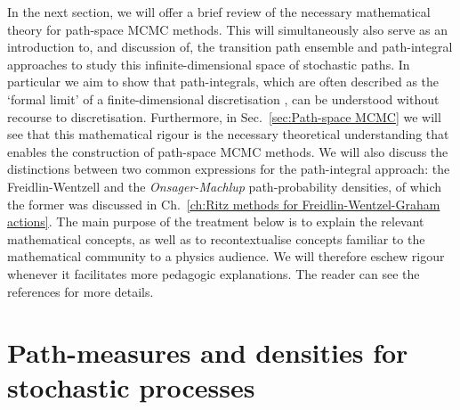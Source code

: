 In the next section, we will offer a brief review of the necessary mathematical theory for path-space MCMC methods. This will simultaneously also serve as an introduction to, and discussion of, the transition path ensemble and path-integral approaches to study this infinite-dimensional space of stochastic paths. In particular we aim to show that path-integrals, which are often described as the `formal limit' of a finite-dimensional discretisation \citep{mossNoiseNonlinearDynamical1989, stratonovichMarkovMethodsTheory1989, moretteDefinitionApproximationFeynman1951}, can be understood without recourse to discretisation. Furthermore, in Sec.~\ref{sec:Path-space MCMC} we will see that this mathematical rigour is the necessary theoretical understanding that enables the construction of path-space MCMC methods. We will also discuss the distinctions between two common expressions for the path-integral approach: the Freidlin-Wentzell and the \textit{Onsager-Machlup} path-probability densities, of which the former was discussed in Ch.~\ref{ch:Ritz methods for Freidlin-Wentzel-Graham actions}. The main purpose of the treatment below is to explain the relevant mathematical concepts, as well as to recontextualise concepts familiar to the mathematical community to a physics audience. We will therefore eschew rigour whenever it facilitates more pedagogic explanations. The reader can see the references for more details.

\section{Path-measures and densities for stochastic processes} 

